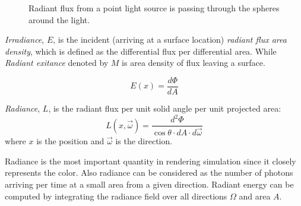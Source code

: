 \begin{figure}[htp]
    \centering
    \renewcommand{\thefigure}{\thechapter.\arabic{figure}}
    \caption[Radiant flux of point light source]{Radiant flux from a point light source is passing through the spheres around the light.}
    \label{fig:flux_point_light}
\end{figure}

\emph{Irradiance}, \(E\), is the incident (arriving at a surface location) \emph{radiant flux area density}, which is defined as the differential flux per differential area. While \emph{Radiant exitance} denoted by \(M\) is area density of flux leaving a surface.

\begin{equation}
E(x) = \frac{d\Phi}{dA}
\end{equation}

\emph{Radiance}, \(L\), is the radiant flux per unit solid angle per unit projected area:
\begin{equation}
L(x, \overrightarrow{\omega}) = \frac{d^{2}\Phi}{\cos{\theta} \cdot dA \cdot d\overrightarrow{\omega}}
\end{equation}
where \(x\) is the position and \(\overrightarrow{\omega}\) is the direction.

Radiance is the most important quantity in rendering simulation since it closely represents the color. Also radiance can be considered as the number of photons arriving per time at a small area from a given direction. Radiant energy can be computed by integrating the radiance field over all directions \(\Omega\) and area \(A\).

